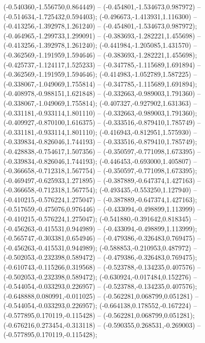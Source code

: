  (-0.540360,-1.556750,0.864449) -- (-0.454801,-1.534673,0.987972) -- (-0.514634,-1.725432,0.594403);
 (-0.496673,-1.413931,1.116300) -- (-0.413256,-1.392978,1.261240) -- (-0.454801,-1.534673,0.987972);
 (-0.464965,-1.299733,1.299091) -- (-0.383693,-1.282221,1.455698) -- (-0.413256,-1.392978,1.261240);
 (-0.441984,-1.205085,1.431570) -- (-0.362569,-1.191959,1.594646) -- (-0.383693,-1.282221,1.455698);
 (-0.425737,-1.124117,1.525233) -- (-0.347785,-1.115689,1.691894) -- (-0.362569,-1.191959,1.594646);
 (-0.414983,-1.052789,1.587225) -- (-0.338067,-1.049069,1.755814) -- (-0.347785,-1.115689,1.691894);
 (-0.408978,-0.988151,1.621848) -- (-0.332663,-0.989003,1.791360) -- (-0.338067,-1.049069,1.755814);
 (-0.407327,-0.927902,1.631363) -- (-0.331181,-0.933114,1.801110) -- (-0.332663,-0.989003,1.791360);
 (-0.409927,-0.870100,1.616375) -- (-0.333516,-0.879410,1.785749) -- (-0.331181,-0.933114,1.801110);
 (-0.416943,-0.812951,1.575930) -- (-0.339834,-0.826046,1.744193) -- (-0.333516,-0.879410,1.785749);
 (-0.428838,-0.754617,1.507356) -- (-0.350597,-0.771098,1.673395) -- (-0.339834,-0.826046,1.744193);
 (-0.446453,-0.693000,1.405807) -- (-0.366658,-0.712318,1.567754) -- (-0.350597,-0.771098,1.673395);
 (-0.469497,-0.625933,1.271895) -- (-0.387889,-0.647374,1.427163) -- (-0.366658,-0.712318,1.567754);
 (-0.493435,-0.553250,1.127940) -- (-0.410215,-0.576224,1.275047) -- (-0.387889,-0.647374,1.427163);
 (-0.517659,-0.475076,0.976446) -- (-0.433094,-0.498899,1.113999) -- (-0.410215,-0.576224,1.275047);
 (-0.541880,-0.391642,0.818345) -- (-0.456263,-0.415531,0.944989) -- (-0.433094,-0.498899,1.113999);
 (-0.565747,-0.303381,0.654946) -- (-0.479386,-0.326483,0.769475) -- (-0.456263,-0.415531,0.944989);
 (-0.588853,-0.210953,0.487972) -- (-0.502053,-0.232398,0.589472) -- (-0.479386,-0.326483,0.769475);
 (-0.610743,-0.115266,0.319568) -- (-0.523788,-0.134235,0.407576) -- (-0.502053,-0.232398,0.589472);
 (-0.630924,-0.017484,0.152276) -- (-0.544054,-0.033293,0.226957) -- (-0.523788,-0.134235,0.407576);
 (-0.648888,0.080991,-0.011025) -- (-0.562281,0.068799,0.051281) -- (-0.544054,-0.033293,0.226957);
 (-0.664138,0.178552,-0.167224) -- (-0.577895,0.170119,-0.115428) -- (-0.562281,0.068799,0.051281);
 (-0.676216,0.273454,-0.313118) -- (-0.590355,0.268531,-0.269003) -- (-0.577895,0.170119,-0.115428);
